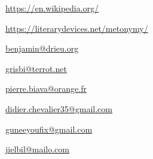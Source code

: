 
\urldef{\urlWikipedia}%
\url{https://en.wikipedia.org/}

\urldef{\urlMetonymyDef}%
\url{https://literarydevices.net/metonymy/}






\urldef{\urlBenjaminDrieuEmail}%
\url{benjamin@drieu.org}     %



\urldef{\urlFrancoisTerrotEmail}%
\url{grisbi@terrot.net}     %


\urldef{\urlPierreBiavaEmail}%
\url{pierre.biava@orange.fr}     %

\urldef{\urlDidierChevalierEmail}%
\url{didier.chevalier35@gmail.com}     %

\urldef{\urlWilliamOllivierEmail}%
\url{guneeyoufix@gmail.com}     %


\urldef{\urlJeanLucDuflotEmail}%
\url{jielbil@mailo.com}     %

